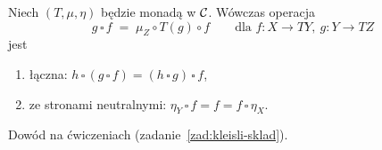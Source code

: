 \begin{stwierdzenie}
Niech $(T, \mu, \eta)$ będzie monadą w $\mathcal{C}$. Wówczas operacja
\[
g \,\square\, f \;=\; \mu_Z \circ T(g) \circ f \qquad \text{dla } f : X \to T Y,\ g : Y \to T Z
\]
jest
\begin{enumerate}
\item łączna: $h \,\square\, (g \,\square\, f) = (h \,\square\, g) \,\square\, f$,
\item ze stronami neutralnymi: $\eta_Y \,\square\, f = f = f \,\square\, \eta_X$.
\end{enumerate}
\end{stwierdzenie}

\begin{uwaga}
Dowód na ćwiczeniach (zadanie~\ref{zad:kleisli-sklad}).
\end{uwaga}

